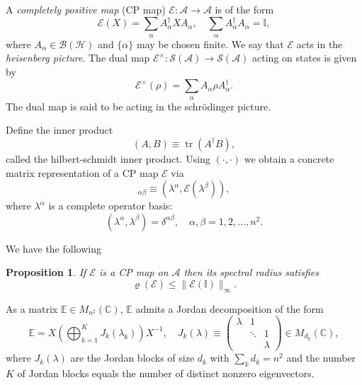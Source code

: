 \documentclass[prl,twocolumn,lengthcheck,superscriptaddress]{revtex4-1}
\newcommand{\tr}{\operatorname{tr}}
\newtheorem{proposition}{Proposition}
\theoremstyle{definition}
\theoremstyle{remark}
\begin{document}
A \emph{completely positive map} (CP map) $\mathcal{E}:\mathcal{A}\rightarrow \mathcal{A}$ is of the form
\begin{equation}
	\mathcal{E}(X) = \sum_{\alpha} A_\alpha^\dag X A_\alpha, \quad \sum_{\alpha} A_\alpha^\dag A_\alpha = \mathbb{I},
\end{equation} 
where $A_\alpha \in \mathcal{B}(\mathcal{H})$ and $\{\alpha\}$ may be chosen finite. We say that $\mathcal{E}$ acts in the \emph{heisenberg picture}. The dual map $\mathcal{E}^\times : \mathcal{S}(\mathcal{A})\rightarrow \mathcal{S}(\mathcal{A})$ acting on states is given by
\begin{equation}
	\mathcal{E}^\times(\rho) = \sum_{\alpha} A_\alpha \rho A_{\alpha}^\dag.
\end{equation}
The dual map is said to be acting in the schr\"odinger picture.

Define the inner product 
\begin{equation}
	(A,B) \equiv \tr(A^\dag B),
\end{equation}
called the hilbert-schmidt inner product. Using $(\cdot, \cdot)$ we obtain a concrete matrix representation of a CP map $\mathcal{E}$ via 
\begin{equation}
	[\mathbb{E}]_{\alpha\beta} \equiv (\lambda^\alpha, \mathcal{E}(\lambda^\beta)),
\end{equation}
where $\lambda^\alpha$ is a complete operator basis:
\begin{equation}
	(\lambda^{\alpha}, \lambda^{\beta}) = \delta^{\alpha\beta}, \quad \alpha, \beta = 1,2, \ldots, n^2.
\end{equation}

We have the following
\begin{proposition}
	If $\mathcal{E}$ is a CP map on $\mathcal{A}$ then its spectral radius satisfies
	\begin{equation}
		\varrho(\mathcal{E}) \le \|\mathcal{E}(\mathbb{I})\|_{\infty}.
	\end{equation}
\end{proposition}

As a matrix $\mathbb{E} \in M_{n^2}(\mathbb{C})$, $\mathbb{E}$ admits a Jordan decomposition of the form
\begin{equation}
	\mathbb{E} = X\left(\bigoplus_{k=1}^K J_k(\lambda_k)\right)X^{-1}, \quad J_k(\lambda) \equiv \begin{pmatrix}\lambda & 1  & \\ & \ddots & 1 \\ && \lambda \end{pmatrix}\in M_{d_k}(\mathbb{C}),
\end{equation}
where $J_k(\lambda)$ are the Jordan blocks of size $d_k$ with $\sum_{k} d_k = n^2$ and the number $K$ of Jordan blocks equals the number of distinct nonzero eigenvectors.
\end{document}
